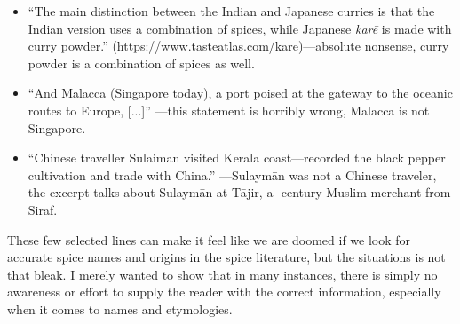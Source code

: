 \begin{itemize}
    \item ``The main distinction between the Indian and Japanese curries is that the Indian version uses a combination of spices, while Japanese \textit{karē} is made with curry powder.'' (https://www.tasteatlas.com/kare)---absolute nonsense, curry powder is a combination of spices as well.
    \item ``And Malacca (Singapore today), a port poised at the gateway to the oceanic routes to Europe, [...]'' \parencite[vi]{hill_contemporary_2004}---this statement is horribly wrong, Malacca is not Singapore.
    \item ``Chinese traveller Sulaiman visited Kerala coast—recorded the black pepper cultivation and trade with China.'' \autocite[3]{ravindran_black_2000}---Sulaymān was not a Chinese traveler, the excerpt talks about Sulaymān at-Tājir, a -century Muslim merchant from Siraf.
\end{itemize}





These few selected lines can make it feel like we are doomed if we look for accurate spice names and origins in the spice literature, but the situations is not that bleak. I merely wanted to show that in many instances, there is simply no awareness or effort to supply the reader with the correct information, especially when it comes to names and etymologies.

